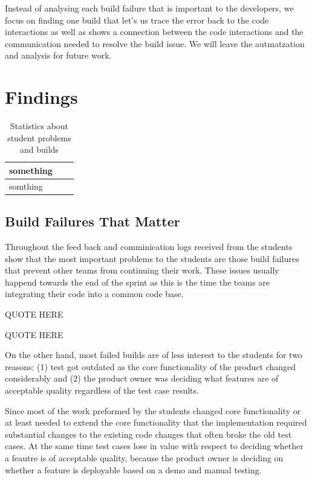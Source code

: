 Instead of analysing each build failure that is important to the developers, we focus on finding one build that let's us trace the error back to the code interactions as well as shows a connection between the code interactions and the communication needed to resolve the build issue.
We will leave the autmatzation and analysis for future work.

\section{Findings}
\begin{table}[tb]
\centering
\begin{tabular}{lll}
\toprule
something\\
\midrule
somthing\\
\bottomrule
\end{tabular}
\label{tab:}
\caption{Statistics about student problems and builds}
\end{table}

\subsection{Build Failures That Matter}
Throughout the feed back and comminication logs received from the students show that the most important problems to the students are those build failures that prevent other teams from continuing their work.
These issues usually happend towards the end of the sprint as this is the time the teams are integrating their code into a common code base.

QUOTE HERE

QUOTE HERE

On the other hand, most failed builds are of less interest to the students for two reasons: 
(1) test got outdated as the core functionality of the product changed considerably 
and (2) the product owner was deciding what features are of acceptable quality regardless of the test case results.

Since most of the work preformed by the students changed core functionality or at least needed to extend the core functionality that the implementation required substantial changes to the existing code changes that often broke the old test cases.
At the same time test cases lose in value with respect to deciding whether a feautre is of acceptable quality, because the product owner is deciding on whether a feature is deployable based on a demo and manual testing.

